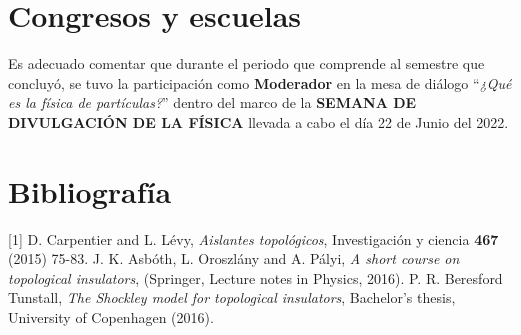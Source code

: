 \documentclass{article}
\begin{document}
\section{Congresos y escuelas}
Es adecuado comentar que durante el periodo que comprende al semestre que concluyó, se tuvo la participación como \textbf{Moderador} en la mesa de diálogo “\textit{¿Qué es la física de partículas?}” dentro
del marco de la \textbf{SEMANA DE DIVULGACIÓN DE LA FÍSICA} llevada a cabo el día 22 de Junio del 2022.


\section*{Bibliografía}
[1] D. Carpentier and L. Lévy, \textit{Aislantes topológicos}, Investigación y ciencia \textbf{467} (2015) 75-83. \newline
[2] J. K. Asbóth, L. Oroszlány and A. Pályi, \textit{A short course on topological insulators}, (Springer, Lecture notes in Physics, 2016). \newline
[3] P. R. Beresford Tunstall, \textit{The Shockley model for topological insulators}, Bachelor's thesis, University of Copenhagen (2016).
\newpage
\end{document}
